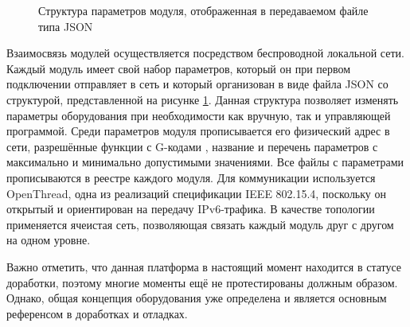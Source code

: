 \begin{figure}[ht]
	\caption{Структура параметров модуля, отображенная в передаваемом файле типа JSON}\label{fig:json}
\end{figure}

Взаимосвязь модулей осуществляется посредством беспроводной локальной сети. Каждый модуль имеет свой набор параметров, который он при первом подключении отправляет в сеть и который организован в виде файла JSON со структурой, представленной на рисунке \cref{fig:json}. Данная структура позволяет изменять параметры оборудования при необходимости как вручную, так и управляющей программой. Среди параметров модуля прописывается его физический адрес в сети, разрешённые функции с G-кодами \cite{gcode}, название и перечень параметров с максимально и минимально допустимыми значениями. Все файлы с параметрами прописываются в реестре каждого модуля. Для коммуникации используется OpenThread, одна из реализаций спецификации IEEE 802.15.4, поскольку он открытый и ориентирован на передачу IPv6-трафика. В качестве топологии применяется ячеистая сеть, позволяющая связать каждый модуль друг с другом на одном уровне.

Важно отметить, что данная платформа в настоящий момент находится в статусе доработки, поэтому многие моменты ещё не протестированы должным образом. Однако, общая концепция оборудования уже определена и является основным референсом в доработках и отладках.

